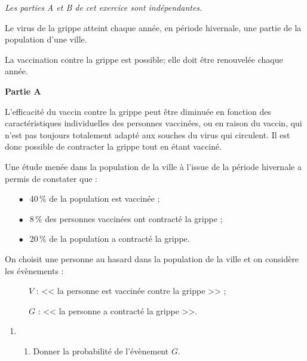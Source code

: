 \documentclass[12pt]{cornouaille}
\begin{document}
\begin{exercice}

\bigskip

\emph{Les parties A et B de cet exercice sont indépendantes.}

\medskip

Le virus de la grippe atteint chaque année, en période hivernale, une partie de la population d'une ville.

La vaccination contre la grippe est possible; elle doit être renouvelée chaque année.

\bigskip

\textbf{Partie A}

\medskip

L'efficacité du vaccin contre la grippe peut être diminuée en fonction des caractéristiques
individuelles des personnes vaccinées, ou en raison du vaccin, qui n'est pas toujours
totalement adapté aux souches du virus qui circulent. Il est donc possible de contracter la
grippe tout en étant vacciné.

Une étude menée dans la population de la ville à l'issue de la période hivernale a permis de constater que :

\begin{itemize}
\item[$\bullet~~$]40\,\% de la population est vaccinée ;
\item[$\bullet~~$]8\,\% des personnes vaccinées ont contracté la grippe ;
\item[$\bullet~~$]20\,\% de la population a contracté la grippe.
\end{itemize}

\smallskip

On choisit une personne au hasard dans la population de la ville et on considère les
évènements :

\begin{description}
\item[ ] $V$ : << la personne est vaccinée contre la grippe >> ;
\item[ ] $G$ : << la personne a contracté la grippe >>.
\end{description}

\medskip

\begin{enumerate}
\item 
	\begin{enumerate}
		\item Donner la probabilité de l'évènement $G$.


\end{enumerate}
\end{enumerate}
\end{exercice}
\end{document}
